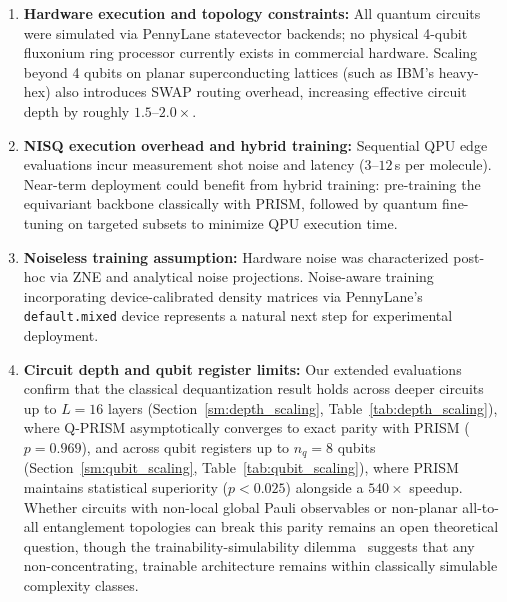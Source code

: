 \documentclass[10pt,twocolumn,letterpaper]{article}
\begin{document}
\begin{enumerate}
    \item \textbf{Hardware execution and topology constraints:} All quantum circuits were simulated via PennyLane statevector backends; no physical 4-qubit fluxonium ring processor currently exists in commercial hardware. Scaling beyond 4 qubits on planar superconducting lattices (such as IBM's heavy-hex) also introduces SWAP routing overhead, increasing effective circuit depth by roughly $1.5$--$2.0\times$.
    \item \textbf{NISQ execution overhead and hybrid training:} Sequential QPU edge evaluations incur measurement shot noise and latency ($3$--$12$\,s per molecule). Near-term deployment could benefit from hybrid training: pre-training the equivariant backbone classically with PRISM, followed by quantum fine-tuning on targeted subsets to minimize QPU execution time.
    \item \textbf{Noiseless training assumption:} Hardware noise was characterized post-hoc via ZNE and analytical noise projections. Noise-aware training~\cite{cincio2021machine, Sharma:2020qjq} incorporating device-calibrated density matrices via PennyLane's \texttt{default.mixed} device represents a natural next step for experimental deployment.
    \item \textbf{Circuit depth and qubit register limits:} Our extended evaluations confirm that the classical dequantization result holds across deeper circuits up to $L = 16$ layers (Section~\ref{sm:depth_scaling}, Table~\ref{tab:depth_scaling}), where Q-PRISM asymptotically converges to exact parity with PRISM ($p = 0.969$), and across qubit registers up to $n_q = 8$ qubits (Section~\ref{sm:qubit_scaling}, Table~\ref{tab:qubit_scaling}), where PRISM maintains statistical superiority ($p < 0.025$) alongside a $540\times$ speedup. Whether circuits with non-local global Pauli observables or non-planar all-to-all entanglement topologies can break this parity remains an open theoretical question, though the trainability-simulability dilemma~\cite{Cerezo:2023nqf} suggests that any non-concentrating, trainable architecture remains within classically simulable complexity classes.
\end{enumerate}



\end{document}
